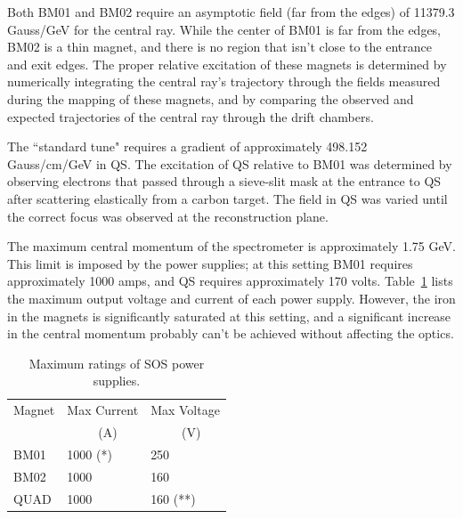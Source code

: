 Both BM01 and BM02 require an asymptotic field (far from the edges) of 11379.3
Gauss/GeV for the central ray. While the center of BM01 is far from the edges,
BM02 is a thin magnet, and there is no region that isn't close to the entrance
and exit edges. The proper relative excitation of these magnets is determined
by numerically integrating the central ray's trajectory through the fields
measured during the mapping of these magnets, and by comparing the observed and
expected trajectories of the central ray through the drift chambers.

The ``standard tune" requires a gradient of approximately 498.152 Gauss/cm/GeV
in QS. The excitation of QS relative to BM01 was determined by observing
electrons that passed through a sieve-slit mask at the entrance to QS after
scattering elastically from a carbon target. The field in QS was varied until
the correct focus was observed at the reconstruction plane.

The maximum central momentum of the spectrometer is approximately 1.75 GeV.
This limit is imposed by the power supplies; at this setting BM01 requires
approximately 1000 amps, and QS requires approximately 170 volts. 
Table~\ref{tab:sos_ratings}
lists the maximum output voltage and current of each power supply. However, the
iron in the magnets is significantly saturated at this setting, and a 
significant
increase in the central momentum probably can't be achieved without affecting
the optics.

\begin{table}
\begin{center}
\caption{Maximum ratings of SOS power supplies. \label{tab:sos_ratings}}
\vspace{\baselineskip}
  \begin{tabular}{lll}
Magnet         &Max Current    &Max Voltage    \\
                     &~~~~~(A)        &~~~~~(V)              \\
\hline
BM01           &1000 (*)       &250            \\
BM02           &1000           &160            \\
QUAD           &1000           &160 (**)       \\
\end{tabular}
\end{center}
\newline
{}

\end{table}

